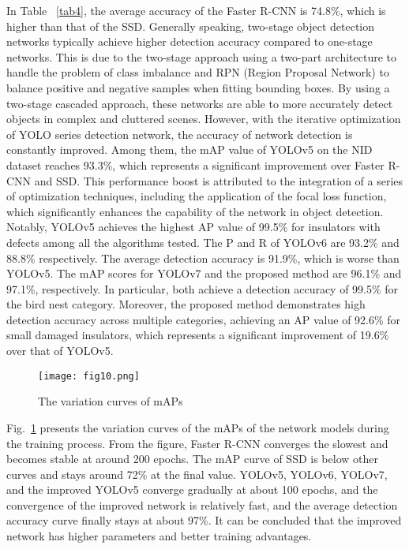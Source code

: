 \documentclass[sn-mathphys,Numbered]{sn-jnl}%
\theoremstyle{thmstyleone}%
\theoremstyle{thmstyletwo}%
\theoremstyle{thmstylethree}%
\begin{document}
In Table ~\ref{tab4}, the average accuracy of the Faster R-CNN is 74.8\%, which is higher than that of the SSD. Generally speaking, two-stage object detection networks typically achieve higher detection accuracy compared to one-stage networks. This is due to the two-stage approach using a two-part architecture to handle the problem of class imbalance and RPN (Region Proposal Network) to balance positive and negative samples when fitting bounding boxes. By using a two-stage cascaded approach, these networks are able to more accurately detect objects in complex and cluttered scenes. However, with the iterative optimization of YOLO series detection network, the accuracy of network detection is constantly improved. Among them, the mAP value of YOLOv5 on the NID dataset reaches 93.3\%, which represents a significant improvement over Faster R-CNN and SSD. This performance boost is attributed to the integration of a series of optimization techniques, including the application of the focal loss function, which significantly enhances the capability of the network in object detection. Notably, YOLOv5 achieves the highest AP value of 99.5\% for insulators with defects among all the algorithms tested. The P and R of YOLOv6 are 93.2\% and 88.8\% respectively. The average detection accuracy is 91.9\%, which is worse than YOLOv5. The mAP scores for YOLOv7 and the proposed method are 96.1\% and 97.1\%, respectively. In particular, both achieve a detection accuracy of 99.5\% for the bird nest category. Moreover, the proposed method demonstrates high detection accuracy across multiple categories, achieving an AP value of 92.6\% for small damaged insulators, which represents a significant improvement of 19.6\% over that of YOLOv5.

\begin{figure}[h]%
\centering
\texttt{[image: fig10.png]}
\caption{The variation curves of mAPs}\label{fig10}
\end{figure}

Fig.~\ref{fig10} presents the variation curves of the mAPs of the network models during the training process. From the figure, Faster R-CNN converges the slowest and becomes stable at around 200 epochs. The mAP curve of SSD is below other curves and stays around 72\% at the final value. YOLOv5, YOLOv6, YOLOv7, and the improved YOLOv5 converge gradually at about 100 epochs, and the convergence of the improved network is relatively fast, and the average detection accuracy curve finally stays at about 97\%. It can be concluded that the improved network has higher parameters and better training advantages.
\end{document}
